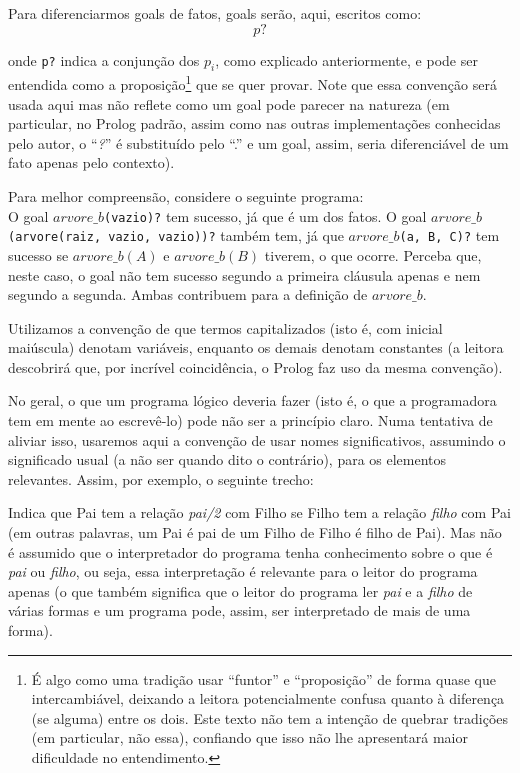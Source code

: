 \documentclass{article}
\theoremstyle{remark}
\begin{document}
Para diferenciarmos goals de fatos, goals serão, aqui, escritos como:
\[
  p?
\]

\noindent onde {\tt p?} indica a conjunção dos $p_i$, como explicado anteriormente, e pode ser entendida como a proposição\footnote{É algo como uma tradição usar ``funtor'' e ``proposição'' de forma quase que intercambiável, deixando a leitora potencialmente confusa quanto à diferença (se alguma) entre os dois. Este texto não tem a intenção de quebrar tradições (em particular, não essa), confiando que isso não lhe apresentará maior dificuldade no entendimento.} que se quer provar. Note que essa convenção será usada aqui mas não reflete como um goal pode parecer na natureza (em particular, no
Prolog padrão, assim como nas outras implementações conhecidas pelo autor, o ``\textit{?}'' é substituído pelo ``.'' e um goal, assim, seria diferenciável de um fato apenas pelo contexto).

Para melhor compreensão, considere o seguinte programa:\\



O goal {\tt $arvore\_b$(vazio)?} tem sucesso, já que é um dos fatos. O goal {\tt $arvore\_b$(arvore(raiz, vazio, vazio))?} também tem, já que {\tt $arvore\_b$(a, B, C)?} tem sucesso se $arvore\_b(A)$ e $arvore\_b(B)$ tiverem, o que ocorre. Perceba que, neste caso, o goal não tem sucesso segundo a primeira cláusula apenas e nem segundo a segunda. Ambas contribuem para a definição de $arvore\_b$.

Utilizamos a convenção de que termos capitalizados (isto é, com inicial maiúscula) denotam variáveis, enquanto os demais denotam constantes (a leitora descobrirá que, por incrível coincidência, o Prolog faz uso da mesma convenção).

No geral, o que um programa lógico deveria fazer (isto é, o que a programadora tem em mente ao escrevê-lo) pode não ser a princípio claro. Numa tentativa de aliviar isso, usaremos aqui a convenção de usar nomes significativos, assumindo o significado usual (a não ser quando dito o contrário), para os elementos relevantes. Assim, por exemplo, o seguinte trecho:




Indica que Pai tem a relação \textit{pai/2} com Filho se Filho tem a relação \textit{filho} com Pai (em outras palavras, um Pai é pai de um Filho de Filho é filho de Pai). Mas não é assumido que o interpretador do programa tenha conhecimento sobre o que é \textit{pai} ou \textit{filho}, ou seja, essa interpretação é relevante para o leitor do programa apenas (o que também significa que o leitor do programa ler \textit{pai} e a \textit{filho} de várias formas e um programa pode, assim,
ser interpretado de mais de uma forma).
\end{document}
